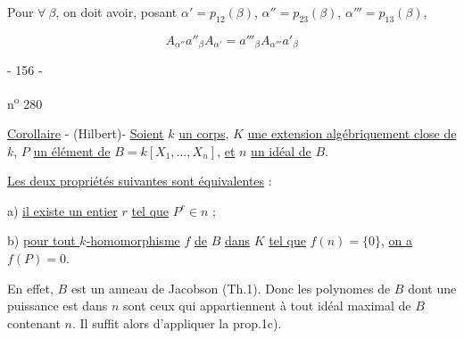 
Pour $\forall\ \beta$, on doit avoir,
posant $\alpha'=p_{12}(\beta)$, $\alpha''=p_{23}(\beta)$,
$\alpha'''=p_{13}(\beta)$, 

\[
\boxed{A_{\alpha''}a''_\beta A_{\alpha'}=a'''_\beta A_{\alpha'''}a'_\beta}
\]
\begin{center}- 156 -\end{center}
\hfill n\textsuperscript{o} 280

\uline{Corollaire} - (Hilbert)- \uline{Soient} $k$ \uline{un corps},
$K$ \uline{une extension algébriquement close de} $k$,
$P$ \uline{un élément de} $B=k[X_1,\ldots,X_n]$, \uline{et}
$n$ \uline{un idéal de} $B$.

\uline{Les deux propriétés suivantes sont équivalentes} :

a) \uline{il existe un entier} $r$ \uline{tel que} $P^r\in n$ ;

b) \uline{pour tout $k$-homomorphisme} $f$ \uline{de} $B$ \uline{dans} $K$
\uline{tel que} $f(n)=\{0\}$, \uline{on a} $f(P)=0$.

En effet, $B$ est un anneau de Jacobson (Th.1). Donc les polynomes
de $B$ dont une puissance est dans $n$ sont ceux qui appartiennent à tout
idéal maximal de $B$ contenant $n$. Il suffit alors d'appliquer la prop.1c).

